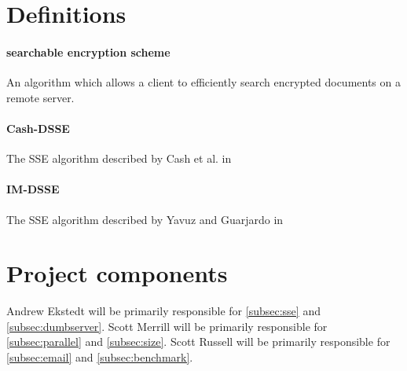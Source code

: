 \documentclass[onecolumn, draftclsnofoot,10pt, compsoc]{IEEEtran}
\begin{document}


\section{ Definitions }

\paragraph*{\textbf{searchable encryption scheme}} An algorithm which allows a client to efficiently search encrypted documents on a remote server.

\paragraph*{\textbf{Cash-DSSE}} The SSE algorithm described by Cash et al. in \cite{cash14}

\paragraph*{\textbf{IM-DSSE}} The SSE algorithm described by Yavuz and Guarjardo in \cite{yavuz15}




\section{ Project components }





Andrew Ekstedt will be primarily responsible for \ref{subsec:sse} and \ref{subsec:dumbserver}.
Scott Merrill will be primarily responsible for \ref{subsec:parallel} and \ref{subsec:size}.
Scott Russell will be primarily responsible for \ref{subsec:email} and \ref{subsec:benchmark}.
\end{document}

